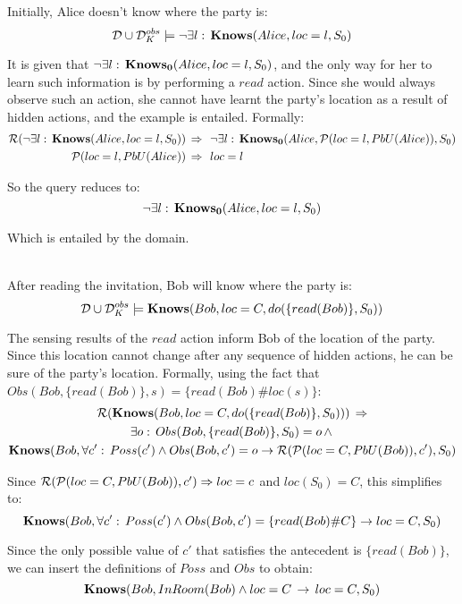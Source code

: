 \begin{example}
Initially, Alice doesn't know where the party is:\[
\mathcal{D}\cup\mathcal{D}_{K}^{obs}\models\neg\exists l:\,\mathbf{Knows}(Alice,loc=l,S_{0})\]

\end{example}
It is given that $\neg\exists l:\,\mathbf{Knows_{0}}(Alice,loc=l,S_{0})$, and
the only way for her to learn such information is by performing a
$read$ action. Since she would always observe such an action, she
cannot have learnt the party's location as a result of hidden actions,
and the example is entailed. Formally:\begin{align*}
\mathcal{R}(\neg\exists l:\,\mathbf{Knows}(Alice,loc=l,S_{0}))\,\Rightarrow\,\,\,\, & \neg\exists l:\,\mathbf{Knows_{0}}(Alice,\mathcal{P}(loc=l,PbU(Alice)),S_{0})\\
\mathcal{P}(loc=l,PbU(Alice))\,\Rightarrow\,\,\,\, & loc=l\end{align*}


So the query reduces to:\[
\neg\exists l:\,\mathbf{Knows_{0}}(Alice,loc=l,S_{0})\]


Which is entailed by the domain.\\
 \\


\begin{example}
After reading the invitation, Bob will know where the party is:\[
\mathcal{D}\cup\mathcal{D}_{K}^{obs}\models\mathbf{Knows}(Bob,loc=C,do(\{read(Bob)\},S_{0}))\]

\end{example}
The sensing results of the $read$ action inform Bob of the location
of the party. Since this location cannot change after any sequence
of hidden actions, he can be sure of the party's location. Formally,
using the fact that $Obs(Bob,\{read(Bob)\},s)=\{read(Bob)\#loc(s)\}$:\begin{multline*}
\mathcal{R}(\mathbf{Knows}(Bob,loc=C,do(\{read(Bob)\},S_{0})))\,\Rightarrow\\
\exists o:\, Obs(Bob,\{read(Bob)\},S_{0})=o\,\wedge\,\\
\mathbf{Knows}(Bob,\forall c':\, Poss(c')\wedge Obs(Bob,c')=o\rightarrow\mathcal{R}(\mathcal{P}(loc=C,PbU(Bob)),c'),S_{0})\end{multline*}


Since $\mathcal{R}(\mathcal{P}(loc=C,PbU(Bob)),c')\Rightarrow loc=c$ and $loc(S_{0})=C$,
this simplifies to:\[
\mathbf{Knows}(Bob,\forall c':\, Poss(c')\wedge Obs(Bob,c')=\{read(Bob)\#C\}\rightarrow loc=C,S_{0})\]


Since the only possible value of $c'$ that satisfies the antecedent
is $\{read(Bob)\}$, we can insert the definitions of $Poss$ and
$Obs$ to obtain:\[
\mathbf{Knows}(Bob,InRoom(Bob)\wedge loc=C\,\rightarrow\, loc=C,S_{0})\]


